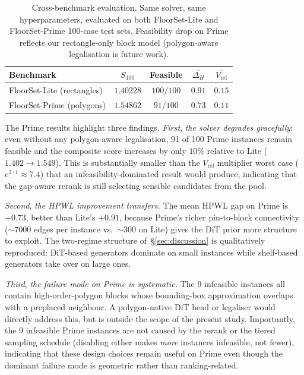 \documentclass[nolineno]{ieeeaccess}
\begin{document}
\begin{table}[t]
\caption{Cross-benchmark evaluation. Same solver, same hyperparameters,
evaluated on both FloorSet-Lite and FloorSet-Prime 100-case test sets.
Feasibility drop on Prime reflects our rectangle-only block model
(polygon-aware legalisation is future work).}
\label{tab:cross-benchmark}
\centering
\footnotesize
\begin{tabular}{@{}lcccc@{}}
\toprule
Benchmark & $S_{100}$ & Feasible & $\overline{\Delta_H}$ & $\overline{V_{\text{rel}}}$\\
\midrule
FloorSet-Lite (rectangles)    & $1.40228$ & $100/100$ & $0.91$ & $0.15$\\
FloorSet-Prime (polygons)     & $1.54862$ & $91/100$  & $0.73$ & $0.11$\\
\bottomrule
\end{tabular}
\end{table}

The Prime results highlight three findings. \emph{First},
\emph{the solver degrades gracefully}: even without any polygon-aware
legalisation, 91 of 100 Prime instances remain feasible and the
composite score increases by only $10\%$ relative to Lite
($1.402\to1.549$). This is substantially smaller than the $V_{\text{rel}}$
multiplier worst case ($e^{2\cdot 1}\approx 7.4$) that an
infeasibility-dominated result would produce, indicating that the
gap-aware rerank is still selecting sensible candidates from the
pool.

\emph{Second}, \emph{the HPWL improvement transfers.} The mean HPWL
gap on Prime is $+0.73$, better than Lite's $+0.91$, because Prime's
richer pin-to-block connectivity ($\sim 7000$ edges per instance vs.\
$\sim 300$ on Lite) gives the DiT prior more structure to exploit. The
two-regime structure of~\S\ref{sec:discussion} is qualitatively
reproduced: DiT-based generators dominate on small instances while
shelf-based generators take over on large ones.

\emph{Third}, \emph{the failure mode on Prime is systematic.} The 9
infeasible instances all contain high-order-polygon blocks whose
bounding-box approximation overlaps with a preplaced neighbour. A
polygon-native DiT head or legaliser would directly address this, but
is outside the scope of the present study. Importantly, the 9
infeasible Prime instances are not caused by the rerank or the
 tiered sampling schedule (disabling either makes \emph{more}
 instances infeasible, not fewer), indicating that these design
 choices remain useful on Prime even though the dominant failure mode
 is geometric rather than ranking-related.
\end{document}
